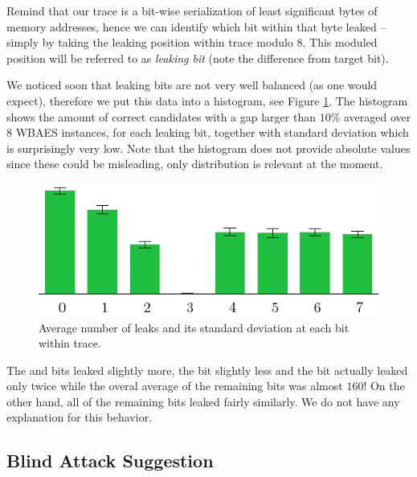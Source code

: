 	Remind that our trace is a bit-wise serialization of least significant bytes of memory addresses, hence we can identify which bit within that byte leaked -- simply by taking the leaking position within trace modulo $8$. This moduled position will be referred to as {\em leaking bit} (note the difference from target bit).
	
	We noticed soon that leaking bits are not very well balanced (as one would expect), therefore we put this data into a histogram, see Figure \ref{fig:leakbitall}. The histogram shows the amount of correct candidates with a gap larger than $10\%$ averaged over $8$ WBAES instances, for each leaking bit, together with standard deviation which is surprisingly very low. Note that the histogram does not provide absolute values since these could be misleading, only distribution is relevant at the moment.
	
	\begin{figure}[h]
	\begin{center}
		\includegraphics{figures/leak_bit/leak_bit.pdf}
		\caption{Average number of leaks and its standard deviation at each bit within trace.}
		\label{fig:leakbitall}
	\end{center}
	\end{figure}
	
	The  and  bits leaked slightly more, the  bit slightly less and the  bit actually leaked only twice while the overal average of the remaining bits was almost $160$! On the other hand, all of the remaining bits leaked fairly similarly. We do not have any explanation for this behavior.



\subsection{Blind Attack Suggestion}
\label{sec:subblindattack}

